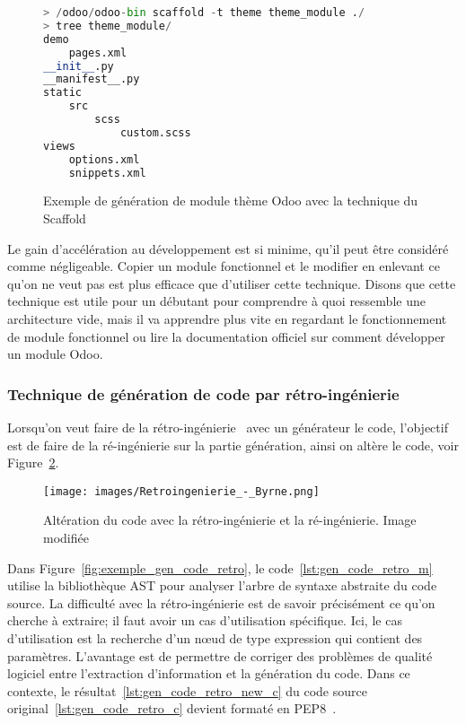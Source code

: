 \begin{figure}
\begin{lstlisting}[language=Python]
> /odoo/odoo-bin scaffold -t theme theme_module ./
> tree theme_module/
demo
    pages.xml
__init__.py
__manifest__.py
static
    src
        scss
            custom.scss
views
    options.xml
    snippets.xml
\end{lstlisting}
\caption{Exemple de génération de module thème Odoo avec la technique du Scaffold}
\label{fig:exemple_odoo_scaffold_theme}
\end{figure}

Le gain d’accélération au développement est si minime, qu'il peut être considéré comme négligeable. Copier un module fonctionnel et le modifier en enlevant ce qu’on ne veut pas est plus efficace que d’utiliser cette technique. Disons que cette technique est utile pour un débutant pour comprendre à quoi ressemble une architecture vide, mais il va apprendre plus vite en regardant le fonctionnement de module fonctionnel ou lire la documentation officiel sur comment développer un module Odoo.

\subsubsection{Technique de génération de code par rétro-ingénierie}

Lorsqu'on veut faire de la rétro-ingénierie~\cite{wikipedia_retroingenierie} avec un générateur le code, l'objectif est de faire de la ré-ingénierie sur la partie génération, ainsi on altère le code, voir Figure~\ref{fig:retro_re_ing}.

\begin{figure}[htb]
\centering
\texttt{[image: images/Retroingenierie\_-\_Byrne.png]}
\caption{Altération du code avec la rétro-ingénierie et la ré-ingénierie. Image modifiée~\cite{wikipedia_image_retroingenierie}}
\label{fig:retro_re_ing}
\end{figure}

Dans Figure~\ref{fig:exemple_gen_code_retro}, le code~\ref{lst:gen_code_retro_m} utilise la bibliothèque AST pour analyser l’arbre de syntaxe abstraite du code source. La difficulté avec la rétro-ingénierie est de savoir précisément ce qu’on cherche à extraire; il faut avoir un cas d’utilisation spécifique. Ici, le cas d’utilisation est la recherche d’un nœud de type expression qui contient des paramètres. L’avantage est de permettre de corriger des problèmes de qualité logiciel entre l’extraction d’information et la génération du code. Dans ce contexte, le résultat~\ref{lst:gen_code_retro_new_c} du code source original~\ref{lst:gen_code_retro_c} devient formaté en PEP8~\cite{python_pep8}.

